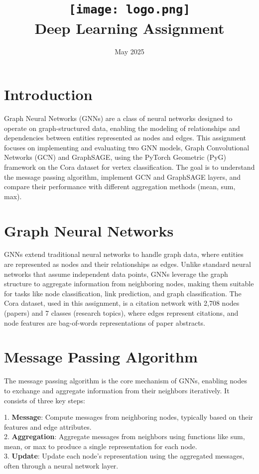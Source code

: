 \documentclass{article}
\title{
    \texttt{[image: logo.png]} \\
    Deep Learning Assignment \\ \exerciseset
}
\author{\FirstAuthor}
\date{May 2025}
\begin{document}
\maketitle

\section*{Introduction}
Graph Neural Networks (GNNs) are a class of neural networks designed to operate on graph-structured data, enabling the modeling of relationships and dependencies between entities represented as nodes and edges. This assignment focuses on implementing and evaluating two GNN models, Graph Convolutional Networks (GCN) and GraphSAGE, using the PyTorch Geometric (PyG) framework on the Cora dataset for vertex classification. The goal is to understand the message passing algorithm, implement GCN and GraphSAGE layers, and compare their performance with different aggregation methods (mean, sum, max).

\section*{Graph Neural Networks}
GNNs extend traditional neural networks to handle graph data, where entities are represented as nodes and their relationships as edges. Unlike standard neural networks that assume independent data points, GNNs leverage the graph structure to aggregate information from neighboring nodes, making them suitable for tasks like node classification, link prediction, and graph classification. The Cora dataset, used in this assignment, is a citation network with 2,708 nodes (papers) and 7 classes (research topics), where edges represent citations, and node features are bag-of-words representations of paper abstracts.

\section*{Message Passing Algorithm}
The message passing algorithm is the core mechanism of GNNs, enabling nodes to exchange and aggregate information from their neighbors iteratively. It consists of three key steps:

1. \textbf{Message}: Compute messages from neighboring nodes, typically based on their features and edge attributes.\\
2. \textbf{Aggregation}: Aggregate messages from neighbors using functions like sum, mean, or max to produce a single representation for each node.\\
3. \textbf{Update}: Update each node's representation using the aggregated messages, often through a neural network layer.
\end{document}
